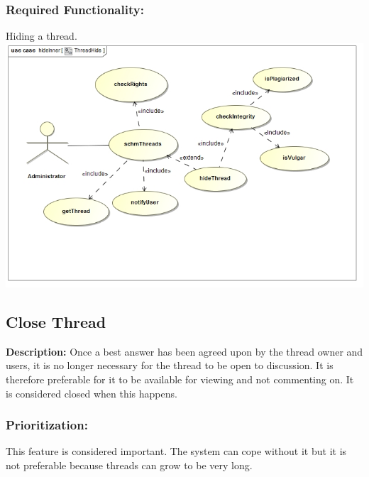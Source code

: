 \documentclass[a4paper,11pt]{article}
\begin{document}
\subsubsection{Required Functionality:} 
Hiding a thread.\\
\includegraphics[width=1\linewidth]{./Images/SCHMThread/ThreadHide.jpg}\\

\subsection{Close Thread}
\textbf{Description:}
Once a best answer has been agreed upon by the thread owner and users, it is no longer necessary for the thread to be open to discussion. It is therefore preferable for it to be available for viewing and not commenting on. It is considered closed when this happens. \\
\subsubsection{Prioritization:}
This feature is considered important. The system can cope without it but it is not preferable because threads can grow to be very long.\\
\end{document}
